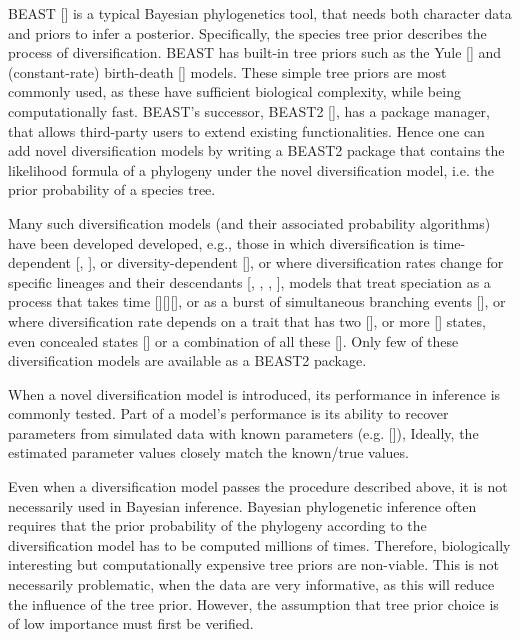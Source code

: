 BEAST [\cite{drummond2007beast}] is a typical Bayesian phylogenetics tool, 
that needs both character data and priors to infer a posterior.
Specifically, the species tree prior describes the process of diversification.
BEAST has built-in tree priors such as the Yule [\cite{yule}] and 
(constant-rate) birth-death [\cite{nee1994reconstructed}] models.
These simple tree priors are most commonly used, as these 
have sufficient biological complexity, while being computationally fast.
BEAST's successor, BEAST2 [\cite{bouckaert2014beast}],
has a package manager, that allows third-party users to extend existing 
functionalities.
Hence one can add novel diversification models by writing a BEAST2 package that contains the likelihood formula
of a phylogeny under the novel diversification model, i.e. the prior probability of a species tree.

Many such diversification models (and their associated probability 
algorithms) have been developed
developed, e.g., those in which diversification is 
time-dependent [\cite{nee1994reconstructed}, \cite{rabosky2008explosive}], 
or diversity-dependent [\cite{etienne2011diversity}],
or where diversification rates change for specific lineages and their descendants [\cite{etienne2012conceptual}, 
\cite{rabosky2014automatic}, \cite{alfaro2009nine}, \cite{laudanno2018sls}], models that treat speciation as a process that takes 
time [\cite{rosindell2010protracted}][\cite{etienne2012prolonging}][\cite{lambert2015reconstructed}], 
or as a burst of simultaneous branching
events [\cite{laudanno2018mbd}], or where diversification rate
depends on a trait that has two [\cite{maddison2007estimating}], 
or more [\cite{fitzjohn2012diversitree}] states,
even concealed states [\cite{beaulieu2016detecting}] 
or a combination of all these [\cite{herrera2018detecting}].
Only few of these diversification models are available as a BEAST2 package.

When a novel diversification model is introduced,
its performance in inference is commonly tested.
Part of a model's performance is its ability to recover parameters from simulated data with known parameters (e.g. [\cite{etienne2014estimating}]),
Ideally, the estimated parameter values closely match the known/true values.

Even when a diversification model passes the procedure described above,
it is not necessarily used in Bayesian inference.
Bayesian phylogenetic inference often requires that the prior probability of the phylogeny according to the diversification model has to be computed millions of times. Therefore, biologically interesting but computationally expensive tree priors are non-viable. This is not necessarily problematic, when the data are very informative, as this will reduce the influence of the tree prior.
However, the assumption that tree prior choice is of low importance must first be verified.


